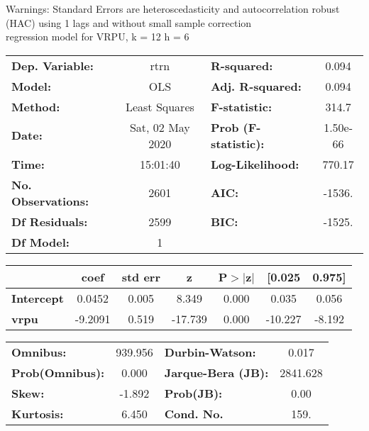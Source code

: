 Warnings: \newline
 [1] Standard Errors are heteroscedasticity and autocorrelation robust (HAC) using 1 lags and without small sample correction\\ 

regression model for VRPU, k = 12 h = 6\begin{center}
\begin{tabular}{lclc}
\toprule
\textbf{Dep. Variable:}    &       rtrn       & \textbf{  R-squared:         } &     0.094   \\
\textbf{Model:}            &       OLS        & \textbf{  Adj. R-squared:    } &     0.094   \\
\textbf{Method:}           &  Least Squares   & \textbf{  F-statistic:       } &     314.7   \\
\textbf{Date:}             & Sat, 02 May 2020 & \textbf{  Prob (F-statistic):} &  1.50e-66   \\
\textbf{Time:}             &     15:01:40     & \textbf{  Log-Likelihood:    } &    770.17   \\
\textbf{No. Observations:} &        2601      & \textbf{  AIC:               } &    -1536.   \\
\textbf{Df Residuals:}     &        2599      & \textbf{  BIC:               } &    -1525.   \\
\textbf{Df Model:}         &           1      & \textbf{                     } &             \\
\bottomrule
\end{tabular}
\begin{tabular}{lcccccc}
                   & \textbf{coef} & \textbf{std err} & \textbf{z} & \textbf{P$> |$z$|$} & \textbf{[0.025} & \textbf{0.975]}  \\
\midrule
\textbf{Intercept} &       0.0452  &        0.005     &     8.349  &         0.000        &        0.035    &        0.056     \\
\textbf{vrpu}      &      -9.2091  &        0.519     &   -17.739  &         0.000        &      -10.227    &       -8.192     \\
\bottomrule
\end{tabular}
\begin{tabular}{lclc}
\textbf{Omnibus:}       & 939.956 & \textbf{  Durbin-Watson:     } &    0.017  \\
\textbf{Prob(Omnibus):} &   0.000 & \textbf{  Jarque-Bera (JB):  } & 2841.628  \\
\textbf{Skew:}          &  -1.892 & \textbf{  Prob(JB):          } &     0.00  \\
\textbf{Kurtosis:}      &   6.450 & \textbf{  Cond. No.          } &     159.  \\
\bottomrule
\end{tabular}
\end{center}

